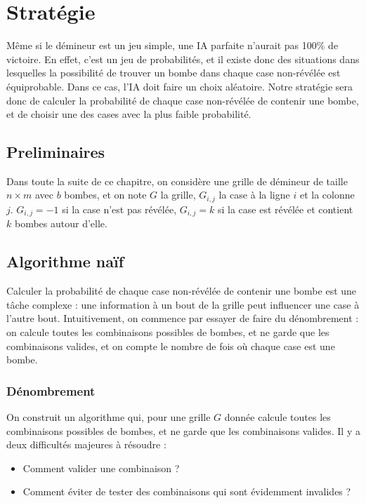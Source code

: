 \setcounter{MaxMatrixCols}{20}
\chapter{Stratégie}
\label{cp:strategie}

Même si le démineur est un jeu simple, une IA parfaite n'aurait pas 100\% de victoire. En effet, c'est un jeu de probabilités, et il existe donc des situations dans lesquelles la possibilité de trouver un bombe dans chaque
case non-révélée est équiprobable. Dans ce cas, l'IA doit faire un choix aléatoire.
\newline
Notre stratégie sera donc de calculer la probabilité de chaque case non-révélée de contenir une bombe, et de choisir une des cases avec la plus faible probabilité.

\section{Preliminaires}

Dans toute la suite de ce chapitre, on considère une grille de démineur de taille $n \times m$ avec $b$ bombes, et on note $G$ la grille, $G_{i,j}$ la case à la ligne $i$ et la colonne $j$.
\newline
$G_{i,j} = -1$ si la case n'est pas révélée, $G_{i,j} = k$ si la case est révélée et contient $k$ bombes autour d'elle.

\section{Algorithme naïf}

Calculer la probabilité de chaque case non-révélée de contenir une bombe est une tâche complexe : une information à un bout de la grille peut influencer une case à l'autre bout.
\newline
Intuitivement, on commence par essayer de faire du dénombrement : on calcule toutes les combinaisons possibles de bombes, et ne garde que les combinaisons valides, et on compte le nombre de fois où chaque case est une bombe.

\subsection{Dénombrement}

On construit un algorithme qui, pour une grille $G$ donnée calcule toutes les combinaisons possibles de bombes, et ne garde que les combinaisons valides.
\newline
Il y a deux difficultés majeures à résoudre :
\begin{itemize}
    \item Comment valider une combinaison ?
    \item Comment éviter de tester des combinaisons qui sont évidemment invalides ?
\end{itemize}

